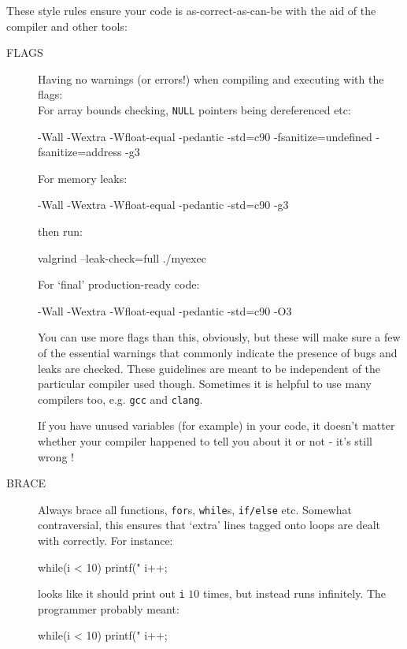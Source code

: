 
These style rules ensure your code is as-correct-as-can-be with the aid
of the compiler and other tools:
\begin{description}
\item[FLAGS] Having no warnings (or errors!) when compiling and executing with the flags:\\
For array bounds checking, \verb^NULL^ pointers being dereferenced etc:
\begin{terminaloutput}
-Wall -Wextra -Wfloat-equal -pedantic -std=c90
-fsanitize=undefined -fsanitize=address -g3
\end{terminaloutput}
For memory leaks:
\begin{terminaloutput}
-Wall -Wextra -Wfloat-equal -pedantic -std=c90
-g3
\end{terminaloutput}
then run:
\begin{terminaloutput}
valgrind --leak-check=full ./myexec
\end{terminaloutput}
For `final' production-ready code:
\begin{terminaloutput}
-Wall -Wextra -Wfloat-equal -pedantic -std=c90
-O3
\end{terminaloutput}

You can use more flags than this, obviously, but these will
make sure a few of the essential warnings that commonly indicate
the presence of bugs and leaks are checked. These guidelines are meant to
be independent of the particular compiler used though. Sometimes it is helpful to use many compilers too, e.g. \verb^gcc^ and \verb^clang^.

If you have unused variables (for example) in your code, it doesn't matter whether your compiler happened to tell you about it or not - it's still wrong !

\item[BRACE] Always brace all functions, \verb^for^s, \verb^while^s, \verb^if/else^ etc.
Somewhat contraversial, this ensures that `extra' lines tagged onto loops are
dealt with correctly. For instance:
\begin{codesnippet}
while(i < 10)
   printf("%
   i++;
\end{codesnippet}
looks like it should print out \verb^i^ $10$ times, but instead runs infinitely.
The programmer probably meant:
\begin{codesnippet}
while(i < 10){
   printf("%
   i++;
}
\end{codesnippet}


\end{description}
